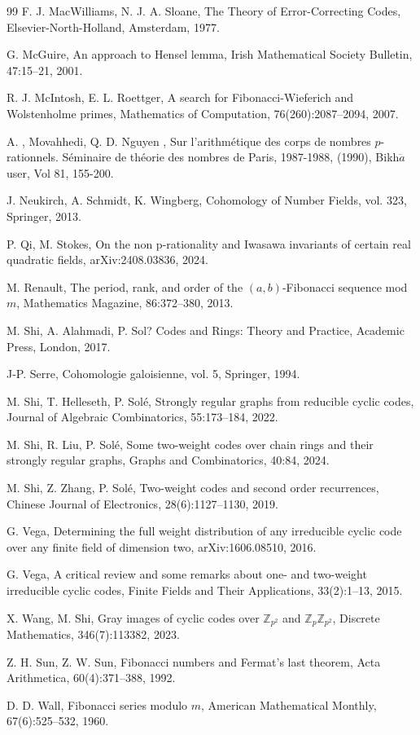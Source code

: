 \documentclass[12pt,reqno]{amsart}
\begin{document}
\begin{thebibliography}{99}
 F. J. MacWilliams, N. J. A. Sloane, The Theory of Error-Correcting Codes, Elsevier-North-Holland, Amsterdam, 1977.

 G. McGuire, An approach to Hensel lemma, Irish Mathematical Society Bulletin, 47:15--21, 2001.

 R. J. McIntosh, E. L. Roettger, A search for Fibonacci-Wieferich and Wolstenholme primes, Mathematics of Computation, 76(260):2087--2094, 2007.

 {A. , Movahhedi}, { Q. D. Nguyen }, {Sur l'arithm\'{e}tique des corps de nombres $p$-rationnels.}
S\'{e}minaire de th\'eorie des nombres de Paris, 1987-1988, (1990), Bikh$\ddot{a}$user, Vol 81, 155-200.

 J. Neukirch, A. Schmidt, K. Wingberg, Cohomology of Number Fields, vol. 323, Springer, 2013.

 P. Qi, M. Stokes, On the non p-rationality and Iwasawa invariants of certain real quadratic fields, arXiv:2408.03836, 2024.

 M. Renault, The period, rank, and order of the $(a, b)$-Fibonacci sequence mod $m$, Mathematics Magazine, 86:372--380, 2013.

 M. Shi, A. Alahmadi, P. Sol? Codes and Rings: Theory and Practice, Academic Press, London, 2017.

 J-P. Serre, Cohomologie galoisienne, vol. 5, Springer, 1994.

 M. Shi, T. Helleseth, P. Sol\'e, Strongly regular graphs from reducible cyclic codes, Journal of Algebraic Combinatorics, 55:173--184, 2022.

 M. Shi, R. Liu, P. Sol\'e, Some two-weight codes over chain rings and their strongly regular graphs, Graphs and Combinatorics, 40:84, 2024.

 M. Shi, Z. Zhang, P. Sol\'e, Two-weight codes and second order recurrences, Chinese Journal of Electronics, 28(6):1127--1130, 2019.

 G. Vega, Determining the full weight distribution of any irreducible cyclic code over any finite field of dimension two, arXiv:1606.08510, 2016.

 G. Vega, A critical review and some remarks about one- and two-weight irreducible cyclic codes, Finite Fields and Their Applications, 33(2):1--13, 2015.

 X. Wang, M. Shi, Gray images of cyclic codes over $\mathbb{Z}_{p^2}$ and $\mathbb{Z}_p \mathbb{Z}_{p^2}$, Discrete Mathematics, 346(7):113382, 2023.

Z. H. Sun, Z. W. Sun, Fibonacci numbers and Fermat's last theorem, Acta Arithmetica, 60(4):371--388, 1992.

D. D. Wall, Fibonacci series modulo $m$, American Mathematical Monthly, 67(6):525--532, 1960.
\end{thebibliography}
\end{document}
